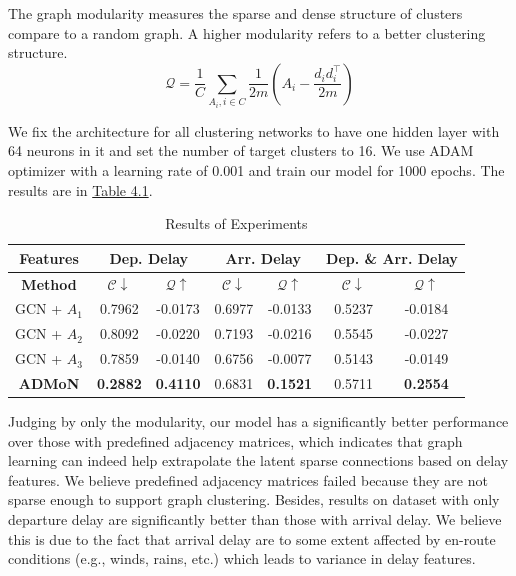The graph modularity measures the sparse and dense structure of clusters compare to a random graph. A higher modularity refers to a better clustering structure.
\begin{equation}
    \mathcal{Q}=\frac{1}{C}\sum_{A_i,i\in C}\frac{1}{2m}\left(A_i-\frac{d_id_i^\intercal}{2m}\right)
\end{equation}

We fix the architecture for all clustering networks to have one hidden layer with 64 neurons in it and set the number of target clusters to 16. We use ADAM optimizer with a learning rate of 0.001 and train our model for 1000 epochs. The results are in \hyperref[tab:4-1]{Table 4.1}.

\begin{table}[thbp]
    \label{tab:4-1}
    \caption{Results of Experiments}
    \centering
    \begin{tabular}{@{}ccccccc@{}}
    \toprule
    \textbf{Features} &
      \multicolumn{2}{c}{\textbf{Dep. Delay}} &
      \multicolumn{2}{c}{\textbf{Arr. Delay}} &
      \multicolumn{2}{c}{\textbf{Dep. \& Arr. Delay}} \\ \midrule
    \textbf{Method} & $\mathcal{C}\downarrow$     & $\mathcal{Q}\uparrow$      & $\mathcal{C}\downarrow$ & $\mathcal{Q}\uparrow$      & $\mathcal{C}\downarrow$ & $\mathcal{Q}\uparrow$      \\
    GCN + $A_1$        & 0.7962          & -0.0173         & 0.6977      & -0.0133         & 0.5237      & -0.0184         \\
    GCN + $A_2$        & 0.8092          & -0.0220         & 0.7193      & -0.0216         & 0.5545      & -0.0227         \\
    GCN + $A_3$        & 0.7859          & -0.0140         & 0.6756      & -0.0077         & 0.5143      & -0.0149         \\
    \textbf{ADMoN}  & \textbf{0.2882} & \textbf{0.4110} & 0.6831      & \textbf{0.1521} & 0.5711      & \textbf{0.2554} \\ \bottomrule
    \end{tabular}
\end{table}

Judging by only the modularity, our model has a significantly better performance over those with predefined adjacency matrices, which indicates that graph learning can indeed help extrapolate the latent sparse connections based on delay features. We believe predefined adjacency matrices failed because they are not sparse enough to support graph clustering. Besides, results on dataset with only departure delay are significantly better than those with arrival delay. We believe this is due to the fact that arrival delay are to some extent affected by en-route conditions (e.g., winds, rains, etc.) which leads to variance in delay features.

